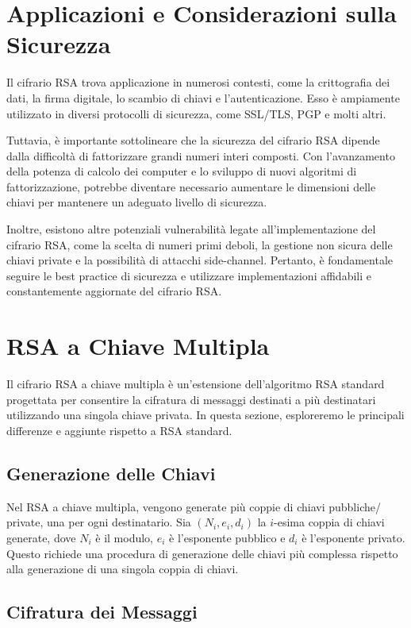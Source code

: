 \documentclass[a4paper,12pt]{report}
\begin{document}
\section{Applicazioni e Considerazioni sulla Sicurezza}
Il cifrario RSA trova applicazione in numerosi contesti, come la crittografia dei dati, la firma digitale, lo scambio di chiavi e l'autenticazione. Esso è ampiamente utilizzato in diversi protocolli di sicurezza, come SSL/TLS, PGP e molti altri.

Tuttavia, è importante sottolineare che la sicurezza del cifrario RSA dipende dalla difficoltà di fattorizzare grandi numeri interi composti. Con l'avanzamento della potenza di calcolo dei computer e lo sviluppo di nuovi algoritmi di fattorizzazione, potrebbe diventare necessario aumentare le dimensioni delle chiavi per mantenere un adeguato livello di sicurezza.

Inoltre, esistono altre potenziali vulnerabilità legate all'implementazione del cifrario RSA, come la scelta di numeri primi deboli, la gestione non sicura delle chiavi private e la possibilità di attacchi side-channel. Pertanto, è fondamentale seguire le best practice di sicurezza e utilizzare implementazioni affidabili e constantemente aggiornate del cifrario RSA.

\section{RSA a Chiave Multipla}

Il cifrario RSA a chiave multipla è un'estensione dell'algoritmo RSA standard progettata per consentire la cifratura di messaggi destinati a più destinatari utilizzando una singola chiave privata. In questa sezione, esploreremo le principali differenze e aggiunte rispetto a RSA standard.

\subsection{Generazione delle Chiavi}

Nel RSA a chiave multipla, vengono generate più coppie di chiavi pubbliche/ private, una per ogni destinatario. Sia \( (N_i, e_i, d_i) \) la \( i \)-esima coppia di chiavi generate, dove \( N_i \) è il modulo, \( e_i \) è l'esponente pubblico e \( d_i \) è l'esponente privato. Questo richiede una procedura di generazione delle chiavi più complessa rispetto alla generazione di una singola coppia di chiavi.

\subsection{Cifratura dei Messaggi}
\end{document}
